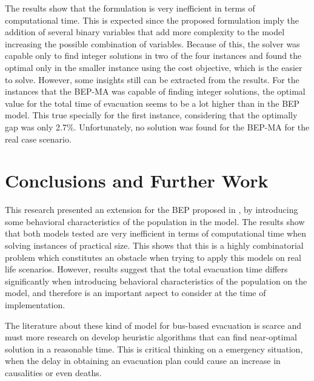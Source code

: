 \documentclass[conference]{IEEEtran}
\begin{document}
The results show that the formulation is very inefficient in terms of computational time. This is expected since the proposed formulation imply the addition of several binary variables that add more complexity to the model increasing the possible combination of variables. Because of this, the solver was capable only to find integer solutions in two of the four instances and found the optimal only in the smaller instance using the cost objective, which is the easier to solve. However, some insights still can be extracted from the results. For the instances that the BEP-MA was capable of finding integer solutions, the optimal value for the total time of evacuation seems to be a lot higher than in the BEP model. This true specially for the first instance, considering that the optimally gap was only 2.7\%. Unfortunately, no solution was found for the BEP-MA for the real case scenario.

\section{Conclusions and Further Work}

This research presented an extension for the BEP proposed in \cite{b1}, by introducing some behavioral characteristics of the population in the model. The results show that both models tested are very inefficient in terms of computational time when solving instances of practical size. This shows that this is a highly combinatorial problem which constitutes an obstacle when trying to apply this models on real life scenarios. However, results suggest that the total evacuation time differs significantly when introducing behavioral characteristics of the population on the model, and therefore is an important aspect to consider at the time of implementation. 

The literature about these kind of model for bus-based evacuation is scarce and must more research on develop heuristic algorithms that can find near-optimal solution in a reasonable time. This is critical thinking on a emergency situation, when the delay in obtaining an evacuation plan could cause an increase in causalities or even deaths. 
\end{document}
